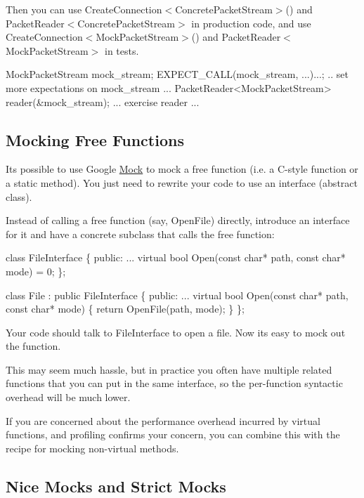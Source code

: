 Then you can use {\ttfamily Create\+Connection$<$Concrete\+Packet\+Stream$>$()} and {\ttfamily Packet\+Reader$<$Concrete\+Packet\+Stream$>$} in production code, and use {\ttfamily Create\+Connection$<$Mock\+Packet\+Stream$>$()} and {\ttfamily Packet\+Reader$<$Mock\+Packet\+Stream$>$} in tests.


\begin{DoxyCode}
MockPacketStream mock\_stream;
EXPECT\_CALL(mock\_stream, ...)...;
.. set more expectations on mock\_stream ...
PacketReader<MockPacketStream> reader(&mock\_stream);
... exercise reader ...
\end{DoxyCode}


\subsection*{Mocking Free Functions}

It\textquotesingle{}s possible to use Google \hyperlink{class_mock}{Mock} to mock a free function (i.\+e. a C-\/style function or a static method). You just need to rewrite your code to use an interface (abstract class).

Instead of calling a free function (say, {\ttfamily Open\+File}) directly, introduce an interface for it and have a concrete subclass that calls the free function\+:


\begin{DoxyCode}
class FileInterface \{
 public:
  ...
  virtual bool Open(const char* path, const char* mode) = 0;
\};

class File : public FileInterface \{
 public:
  ...
  virtual bool Open(const char* path, const char* mode) \{
    return OpenFile(path, mode);
  \}
\};
\end{DoxyCode}


Your code should talk to {\ttfamily File\+Interface} to open a file. Now it\textquotesingle{}s easy to mock out the function.

This may seem much hassle, but in practice you often have multiple related functions that you can put in the same interface, so the per-\/function syntactic overhead will be much lower.

If you are concerned about the performance overhead incurred by virtual functions, and profiling confirms your concern, you can combine this with the recipe for mocking non-\/virtual methods.

\subsection*{Nice Mocks and Strict Mocks}

